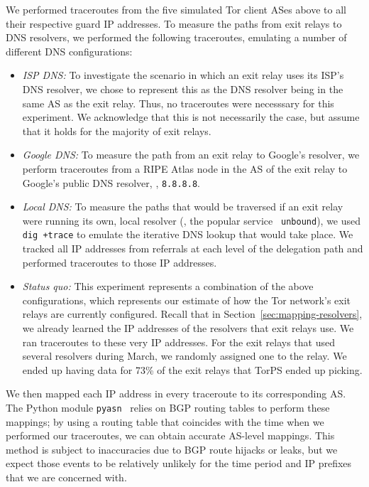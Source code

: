 We performed traceroutes from the five simulated Tor client ASes above to all
their respective guard IP addresses.  To measure the paths from exit relays to
DNS resolvers, we performed the following traceroutes, emulating a number of
different DNS configurations:
\begin{itemize}
    \item \emph{ISP DNS:} To investigate the scenario in which an exit 
      relay uses its ISP's DNS resolver, we chose to represent this as 
      the DNS resolver being in the same AS as the exit relay. 
      Thus, no traceroutes were necesssary for this experiment. 
      We acknowledge that this is not necessarily the case, but assume that it
      holds for the majority of exit relays.

    \item \emph{Google DNS:} To measure the path from an exit relay to
      Google's resolver, we perform traceroutes from a RIPE Atlas node
      in the AS of the exit relay to Google's public DNS resolver, \ie,
      {\tt 8.8.8.8}.

    \item \emph{Local DNS:} To measure the paths that would be traversed if an
      exit relay were running its own, local resolver (\eg, the popular service {\tt
      unbound}), we used {\tt dig +trace} to emulate the
      iterative DNS lookup that would take place. We tracked all IP
      addresses from referrals at each level of the delegation path and
      performed traceroutes to those IP addresses.

    \item \emph{Status quo:} This experiment represents a combination of
      the above configurations, which represents our estimate of how the
      Tor network's exit relays are currently configured.  Recall that in
      Section~\ref{sec:mapping-resolvers}, we already learned the IP addresses
      of the resolvers that exit relays use.  We ran traceroutes to these very
      IP addresses.  For the exit relays that used several resolvers during
      March, we randomly assigned one to the relay.  We ended up having data for
      73\% of the exit relays that TorPS ended up picking.
\end{itemize}
\noindent
We then mapped each IP address in every traceroute to its corresponding
AS.  The Python module {\tt pyasn}~\cite{pyasn} relies on BGP routing tables to
perform these mappings; by using a routing table that coincides with the
time when we performed our traceroutes, we can obtain accurate AS-level
mappings.  This method is subject to inaccuracies due to BGP route
hijacks or leaks, but we expect those events to be relatively unlikely
for the time period and IP prefixes that we are concerned with.

